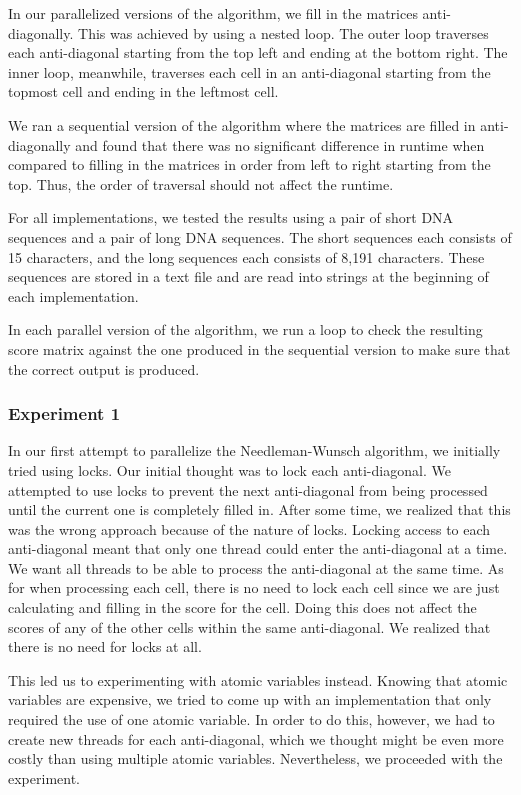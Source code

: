 \documentclass[conference]{IEEEtran}
\begin{document}
In our parallelized versions of the algorithm, we fill in the matrices anti-diagonally. This was achieved by using a nested loop. The outer loop traverses each anti-diagonal starting from the top left and ending at the bottom right. The inner loop, meanwhile, traverses each cell in an anti-diagonal starting from the topmost cell and ending in the leftmost cell.

We ran a sequential version of the algorithm where the matrices are filled in anti-diagonally and found that there was no significant difference in runtime when compared to filling in the matrices in order from left to right starting from the top. Thus, the order of traversal should not affect the runtime.

For all implementations, we tested the results using a pair of short DNA sequences and a pair of long DNA sequences. The short sequences each consists of 15 characters, and the long sequences each consists of 8,191 characters. These sequences are stored in a text file and are read into strings at the beginning of each implementation.

In each parallel version of the algorithm, we run a loop to check the resulting score matrix against the one produced in the sequential version to make sure that the correct output is produced.

\subsubsection{Experiment 1}
In our first attempt to parallelize the Needleman-Wunsch algorithm, we initially tried using locks. Our initial thought was to lock each anti-diagonal. We attempted to use locks to prevent the next anti-diagonal from being processed until the current one is completely filled in. After some time, we realized that this was the wrong approach because of the nature of locks. Locking access to each anti-diagonal meant that only one thread could enter the anti-diagonal at a time. We want all threads to be able to process the anti-diagonal at the same time. As for when processing each cell, there is no need to lock each cell since we are just calculating and filling in the score for the cell. Doing this does not affect the scores of any of the other cells within the same anti-diagonal. We realized that there is no need for locks at all.

This led us to experimenting with atomic variables instead. Knowing that atomic variables are expensive, we tried to come up with an implementation that only required the use of one atomic variable. In order to do this, however, we had to create new threads for each anti-diagonal, which we thought might be even more costly than using multiple atomic variables. Nevertheless, we proceeded with the experiment.
\end{document}
